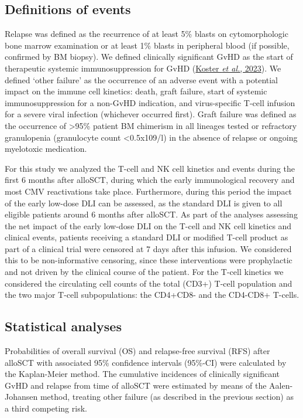 \documentclass[
  letterpaper,
  DIV=11,
  numbers=noendperiod]{scrreprt}
\begin{document}
\hypertarget{definitions-of-events}{%
\subsection{Definitions of events}\label{definitions-of-events}}

Relapse was defined as the recurrence of at least 5\% blasts on
cytomorphologic bone marrow examination or at least 1\% blasts in
peripheral blood (if possible, confirmed by BM biopsy). We defined
clinically significant GvHD as the start of therapeutic systemic
immunosuppression for GvHD
(\protect\hyperlink{ref-kosterCompetitiveRepopulationAlloImmunologic2023}{Koster
\emph{et al.}, 2023}). We defined `other failure' as the occurrence of
an adverse event with a potential impact on the immune cell kinetics:
death, graft failure, start of systemic immunosuppression for a non-GvHD
indication, and virus-specific T-cell infusion for a severe viral
infection (whichever occurred first). Graft failure was defined as the
occurrence of \textgreater95\% patient BM chimerism in all lineages
tested or refractory granulopenia (granulocyte count \textless0.5x109/l)
in the absence of relapse or ongoing myelotoxic medication.

For this study we analyzed the T-cell and NK cell kinetics and events
during the first 6 months after alloSCT, during which the early
immunological recovery and most CMV reactivations take place.
Furthermore, during this period the impact of the early low-dose DLI can
be assessed, as the standard DLI is given to all eligible patients
around 6 months after alloSCT. As part of the analyses assessing the net
impact of the early low-dose DLI on the T-cell and NK cell kinetics and
clinical events, patients receiving a standard DLI or modified T-cell
product as part of a clinical trial were censored at 7 days after this
infusion. We considered this to be non-informative censoring, since
these interventions were prophylactic and not driven by the clinical
course of the patient. For the T-cell kinetics we considered the
circulating cell counts of the total (CD3+) T-cell population and the
two major T-cell subpopulations: the CD4+CD8- and the CD4-CD8+ T-cells.

\hypertarget{statistical-analyses}{%
\subsection{Statistical analyses}\label{statistical-analyses}}

Probabilities of overall survival (OS) and relapse-free survival (RFS)
after alloSCT with associated 95\% confidence intervals (95\%-CI) were
calculated by the Kaplan-Meier method. The cumulative incidences of
clinically significant GvHD and relapse from time of alloSCT were
estimated by means of the Aalen-Johansen method, treating other failure
(as described in the previous section) as a third competing risk.
\end{document}
